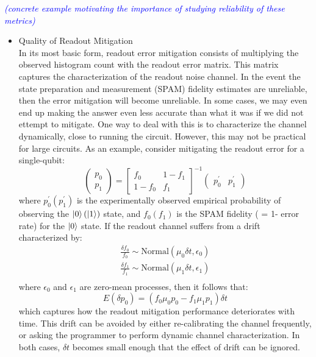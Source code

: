 \documentclass[conference]{IEEEtran}
\begin{document}
\textcolor{blue}{\textit{(concrete example motivating the importance of studying reliability of these metrics)}}
\begin{itemize}
\item Quality of Readout Mitigation\\
In its most basic form, readout error mitigation consists of multiplying the observed histogram count with the readout error matrix. This matrix captures the characterization of the readout noise channel. In the event the state preparation and measurement (SPAM) fidelity estimates are unreliable, then the error mitigation will become unreliable. In some cases, we may even end up making the answer even less accurate than what it was if we did not ettempt to mitigate. One way to deal with this is to characterize the channel dynamically, close to running the circuit. However, this may not be practical for large circuits. As an example, consider mitigating the readout error for a single-qubit:
\begin{equation}
\begin{pmatrix}
p_0\\p_1
\end{pmatrix}
=
\begin{bmatrix}
f_0 & 1-f_1\\
1-f_0 & f_1
\end{bmatrix}^{-1}
\begin{pmatrix}
p_0^\prime & p_1^\prime
\end{pmatrix}
\end{equation}
where 
$p_0^\prime (p_1^\prime)$ is the experimentally observed empirical probability of observing the $\ket{0} (\ket{1})$ state,
and $f_0 (f_1)$ is the SPAM fidelity ( = 1- error rate) for the $\ket{0}$ state.
If the readout channel suffers from a drift characterized by:
\begin{equation}
\begin{split}
\frac{\delta f_0}{f_0} \sim \textrm{Normal}(\mu_0 \delta t, \epsilon_0)\\
\frac{\delta f_1}{f_1} \sim \textrm{Normal}(\mu_1 \delta t, \epsilon_1)\\
\end{split}
\end{equation}
where $\epsilon_0$ and $\epsilon_1$ are zero-mean processes, then it follows that:
\begin{equation}
E(\delta p_0) = (f_0 \mu_0 p_0 - f_1 \mu_1 p_1)\delta t
\end{equation}
which captures how the readout mitigation performance deteriorates with time. This drift can be avoided by either re-calibrating the channel frequently, or asking the programmer to perform dynamic channel characterization. In both cases, $\delta t$ becomes small enough that the effect of drift can be ignored.


\end{itemize}
\end{document}
